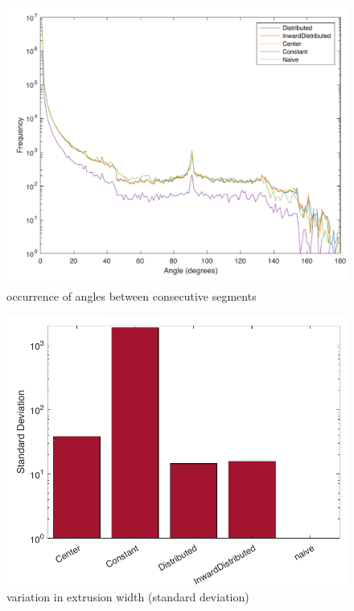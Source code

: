 \begin{figure}
\includegraphics[width=\columnwidth]{sources/validation/smoothness.pdf}
\caption{occurrence of angles between consecutive segments}
\label{smoothness}
\end{figure}

\begin{figure}
\includegraphics[width=\columnwidth]{sources/validation/SD.pdf}
\caption{variation in extrusion width (standard deviation)}
\label{sd}
\end{figure}

